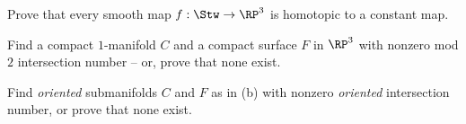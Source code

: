 \begin{alist}
\item Prove that every smooth map $f:\Stw\rightarrow \RP^3$ is
homotopic to a constant map.
\item Find a compact $1$-manifold $C$ and a compact surface $F$ in
$\RP^3$ with nonzero mod $2$ intersection number -- or, prove that
none exist.
\item Find \emph{oriented} submanifolds $C$ and $F$ as in (b) with
nonzero \emph{oriented} intersection number, or prove that none exist.
\end{alist}
